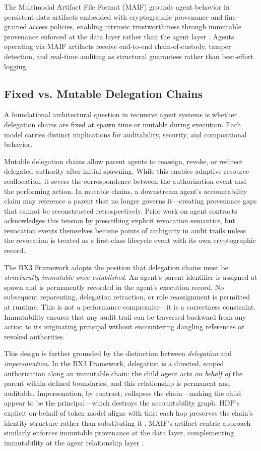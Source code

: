 The Multimodal Artifact File Format (MAIF) grounds agent behavior in persistent data artifacts embedded with cryptographic provenance and fine-grained access policies, enabling intrinsic trustworthiness through immutable provenance enforced at the data layer rather than the agent layer \cite{maif2025}. Agents operating via MAIF artifacts receive end-to-end chain-of-custody, tamper detection, and real-time auditing as structural guarantees rather than best-effort logging.

\subsection{Fixed vs. Mutable Delegation Chains}

A foundational architectural question in recursive agent systems is whether delegation chains are fixed at spawn time or mutable during execution. Each model carries distinct implications for auditability, security, and compositional behavior.

Mutable delegation chains allow parent agents to reassign, revoke, or redirect delegated authority after initial spawning. While this enables adaptive resource reallocation, it severs the correspondence between the authorization event and the performing action. In mutable chains, a downstream agent's accountability claim may reference a parent that no longer governs it---creating provenance gaps that cannot be reconstructed retrospectively. Prior work on agent contracts acknowledges this tension by prescribing explicit revocation semantics, but revocation events themselves become points of ambiguity in audit trails unless the revocation is treated as a first-class lifecycle event with its own cryptographic record.

The BX3 Framework adopts the position that delegation chains must be \textit{structurally immutable once established}. An agent's parent identifier is assigned at spawn and is permanently recorded in the agent's execution record. No subsequent reparenting, delegation retraction, or role reassignment is permitted at runtime. This is not a performance compromise---it is a correctness constraint. Immutability ensures that any audit trail can be traversed backward from any action to its originating principal without encountering dangling references or revoked authorities.

This design is further grounded by the distinction between \textit{delegation} and \textit{impersonation}. In the BX3 Framework, delegation is a directed, scoped authorization along an immutable chain: the child agent acts \textit{on behalf of} the parent within defined boundaries, and this relationship is permanent and auditable. Impersonation, by contrast, collapses the chain---making the child appear to be the principal---which destroys the accountability graph. HDP's explicit on-behalf-of token model aligns with this: each hop preserves the chain's identity structure rather than substituting it \cite{hdp2026}. MAIF's artifact-centric approach similarly enforces immutable provenance at the data layer, complementing immutability at the agent relationship layer \cite{maif2025}.

